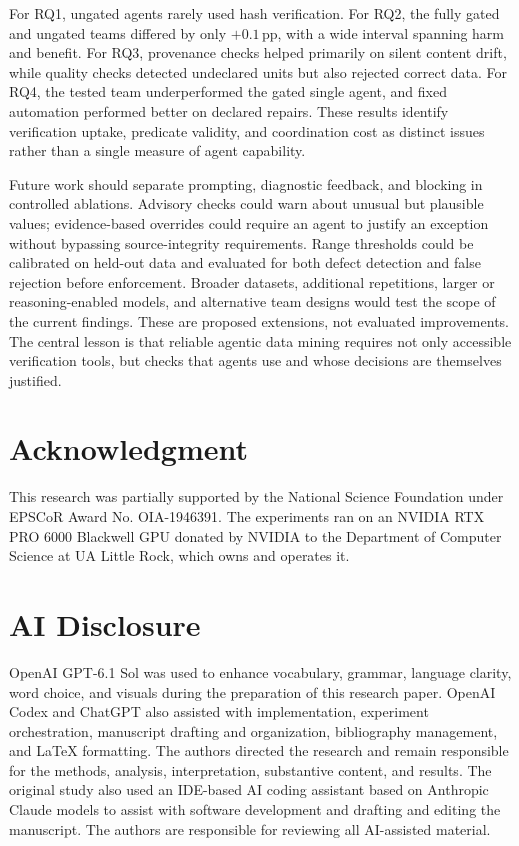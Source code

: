 \documentclass[conference]{IEEEtran}
\begin{document}
For RQ1, ungated agents rarely used hash verification. For RQ2, the fully gated and ungated teams differed by only $+0.1$\,pp, with a wide interval spanning harm and benefit. For RQ3, provenance checks helped primarily on silent content drift, while quality checks detected undeclared units but also rejected correct data. For RQ4, the tested team underperformed the gated single agent, and fixed automation performed better on declared repairs. These results identify verification uptake, predicate validity, and coordination cost as distinct issues rather than a single measure of agent capability.

Future work should separate prompting, diagnostic feedback, and blocking in controlled ablations. Advisory checks could warn about unusual but plausible values; evidence-based overrides could require an agent to justify an exception without bypassing source-integrity requirements. Range thresholds could be calibrated on held-out data and evaluated for both defect detection and false rejection before enforcement. Broader datasets, additional repetitions, larger or reasoning-enabled models, and alternative team designs would test the scope of the current findings. These are proposed extensions, not evaluated improvements. The central lesson is that reliable agentic data mining requires not only accessible verification tools, but checks that agents use and whose decisions are themselves justified.

\section*{Acknowledgment}
This research was partially supported by the National Science Foundation under EPSCoR Award No. OIA-1946391.
The experiments ran on an NVIDIA RTX PRO 6000 Blackwell GPU donated by NVIDIA to the Department of Computer Science at UA Little Rock, which owns and operates it.

\section*{AI Disclosure}
OpenAI GPT-6.1 Sol was used to enhance vocabulary, grammar, language clarity, word choice, and visuals during the preparation of this research paper. OpenAI Codex and ChatGPT also assisted with implementation, experiment orchestration, manuscript drafting and organization, bibliography management, and LaTeX formatting. The authors directed the research and remain responsible for the methods, analysis, interpretation, substantive content, and results.
The original study also used an IDE-based AI coding assistant based on Anthropic Claude models to assist with software development and drafting and editing the manuscript. The authors are responsible for reviewing all AI-assisted material.



\end{document}
